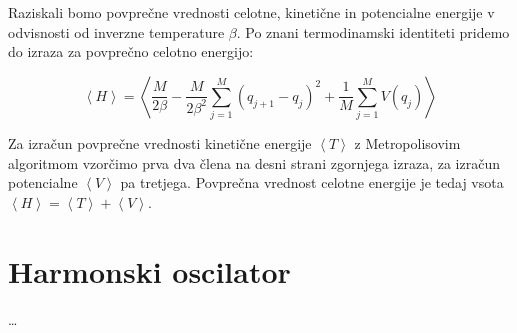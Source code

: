\documentclass[a4paper]{article}
\newcommand{\expected}[1]{\left\langle #1 \right\rangle}
\begin{document}
    Raziskali bomo povprečne vrednosti celotne, kinetične in potencialne energije v odvisnosti od inverzne temperature
    $\beta$.
    Po znani termodinamski identiteti pridemo do izraza za povprečno celotno energijo:

    \begin{equation}\label{eq5}
        \expected{H} = \expected{\frac{M}{2\beta} - \frac{M}{2\beta^2}\sum_{j=1}^M (q_{j+1} - q_j)^2
                                + \frac{1}{M}\sum_{j=1}^M V(q_j)}
    \end{equation}

    Za izračun povprečne vrednosti kinetične energije $\expected{T}$ z Metropolisovim algoritmom vzorčimo prva dva člena
    na desni strani zgornjega izraza, za izračun potencialne $\expected{V}$ pa tretjega.
    Povprečna vrednost celotne energije je tedaj vsota $\expected{H} = \expected{T} + \expected{V}$.

    \section{Harmonski oscilator}

    \ldots

    \iffalse
    \begin{figure}
        \centering
        \begin{subfigure}{\textwidth}
            \texttt{[image: slika1.pdf]}
            \caption{}
        \end{subfigure}
        \begin{subfigure}{\textwidth}
            \texttt{[image: slika2.pdf]}
            \caption{}
        \end{subfigure}
        \begin{subfigure}{\textwidth}
            \texttt{[image: slika3.pdf]}
            \caption{}
        \end{subfigure}
        \caption{Fazni prehodi Isingovega modela za različno velike mreže.
        Oranžna črta prilagojena na graf magnetizacije predstavlja Onsagerjevo formulo za spontano magnetizacijo.
        Z rdečo vertikalno črto je označena kritična temperatura določena s to prilagoditvijo.
        Vse je računano pri sklopitveni konstanti $J = 1$.}
        \label{slika1}
    \end{figure}
    \fi
\end{document}

